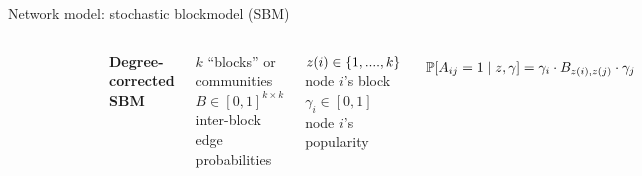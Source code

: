 \documentclass{beamer}
\theoremstyle{remark}
\DeclarePairedDelimiter{\set}{\{}{\}}
\DeclarePairedDelimiter{\brac}{[}{]}
\renewcommand{\P}[2][]{%
   \ifthenelse{ \equal{#1}{} }
      {\ensuremath{\mathbb{P} \brac*{#2}}}
      {\ensuremath{\mathbb{P} \brac*{#2 \mid #1}}}
}
\begin{document}
\begin{frame}{Network model: stochastic blockmodel (SBM)}
    \begin{columns}

        \begin{figure}
            \includegraphics[width=\textwidth]{figures/assortative.png}
        \end{figure}


        \textbf{Degree-corrected SBM}

        \vspace{4mm}

        $k$ ``blocks'' or communities
        $B \in [0, 1]^{k \times k}$ inter-block edge probabilities

        \vspace{3mm}

        $z(i) \in \set{1, ...., k}$ node $i$'s block
        $\gamma_i \in [0, 1]$ node $i$'s popularity

        \begin{align*}
            \P[z, \gamma]{A_{ij} = 1} = \gamma_i \cdot B_{z(i), z(j)} \cdot \gamma_j
        \end{align*}

    \end{columns}
\end{frame}
\end{document}
